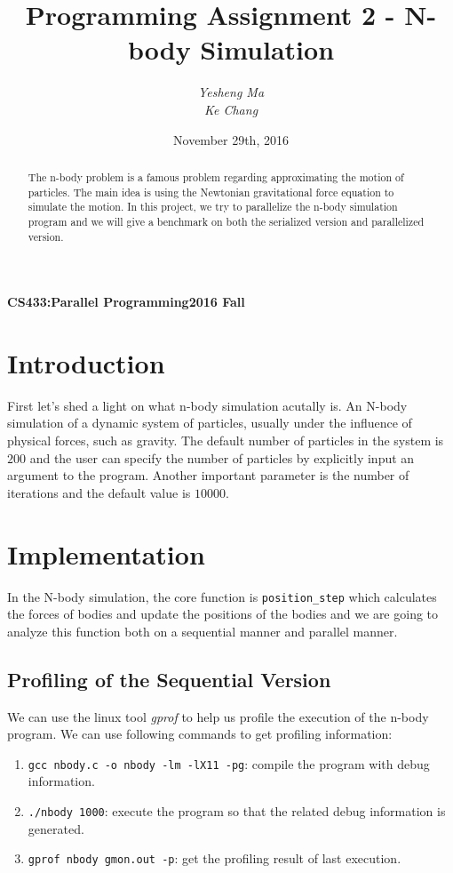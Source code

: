 \documentclass{article}
\begin{document}
\title{Programming Assignment 2 - N-body Simulation}
\author{\textit{Yesheng Ma}\\\textit{Ke Chang}}
\date{November 29th, 2016}
{\bf\small CS433:Parallel Programming}\hfill{\bf\small 2016 Fall}
{\let\newpage\relax\maketitle}
\maketitle


\begin{abstract}
	The n-body problem is a famous problem regarding approximating the motion of particles. The main idea is using the Newtonian gravitational force equation
	to simulate the motion. In this project, we try to parallelize the n-body simulation program and we will give a benchmark on both the serialized version
	and parallelized version.
\end{abstract}


\section{Introduction}
First let's shed a light on what n-body simulation acutally is. An N-body simulation of a dynamic system of particles, usually under the influence of physical
forces, such as gravity. The default number of particles in the system is $200$ and the user can specify the number of particles by explicitly input an argument
to	the program. Another important parameter is the number of iterations and the default value is $10000$.


\section{Implementation}
In the N-body simulation, the core function is \verb|position_step| which calculates the forces of bodies and update the positions of the bodies and 
we are going to analyze this function both on a sequential manner and parallel manner.

\subsection{Profiling of the Sequential Version}
We can use the linux tool \emph{gprof} to help us profile the execution of the n-body program. We can use following commands to get profiling information:
\begin{enumerate}
	\item \verb|gcc nbody.c -o nbody -lm -lX11 -pg|: compile the program with debug information.
	\item \verb|./nbody 1000|: execute the program so that the related debug information is generated.
	\item \verb|gprof nbody gmon.out -p|: get the profiling result of last execution.
\end{enumerate}
\end{document}
